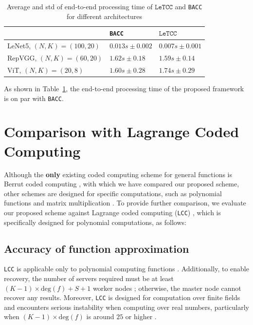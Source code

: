 \documentclass{article}
\def\nprcc{\texttt{LeTCC}}
\begin{document}
\setlength{\tabcolsep}{5pt}
\setlength{\extrarowheight}{2pt}
\begin{table}[h]
\caption{Average and std of end-to-end processing time of $\nprcc$ and \texttt{BACC} for different architectures}
\label{tab:complexity}
\begin{center}
\begin{small}
\begin{sc}
\begin{tabular}[h]{lll} 
& \texttt{BACC} & $\nprcc$ \\
\hline LeNet5, $(N, K)=(100,20)$ & $0.013 s \pm 0.002$ & $0.007 s \pm 0.001$ \\
 \hline RepVGG, $(N, K)=(60,20)$ & $1.62 s \pm 0.18$ & $1.59 s \pm 0.14$ \\
 \hline ViT, $(N, K)=(20,8)$ & $1.60 s \pm 0.28$ & $1.74 s \pm 0.29$
\end{tabular}
\end{sc}
\end{small}
\end{center}
\end{table}

As shown in Table~\ref{tab:complexity}, the end-to-end processing time of the proposed framework is on par with \texttt{BACC}.

\section{Comparison with Lagrange Coded Computing}\label{app:comp_lagrange}
Although the {\bf only} existing coded computing scheme for general functions is Berrut coded computing \citep{jahani2022berrut}, with which we have compared our proposed scheme, other schemes are designed for specific computations, such as polynomial functions \citep{yu2019lagrange} and matrix multiplication \citep{yu2017polynomial}.
To provide further comparison, we evaluate our proposed scheme against Lagrange coded computing (\texttt{LCC}) \citep{yu2019lagrange}, which is specifically designed for polynomial computations, as follows:


\subsection{Accuracy of function approximation} \texttt{LCC} is applicable only to polynomial computing functions \citep{yu2019lagrange}. Additionally, to enable recovery, the number of servers required must be at least $(K-1) \times \text{deg}(f) + S + 1$ worker nodes \citep{yu2019lagrange, jahani2022berrut}; otherwise, the master node cannot recover any results. Moreover, \texttt{LCC} is designed for computation over finite fields and encounters serious instability when computing over real numbers, particularly when $(K-1) \times \text{deg}(f)$ is around $25$ or higher \citep{jahani2022berrut,gautschi1987lower}.
\end{document}
